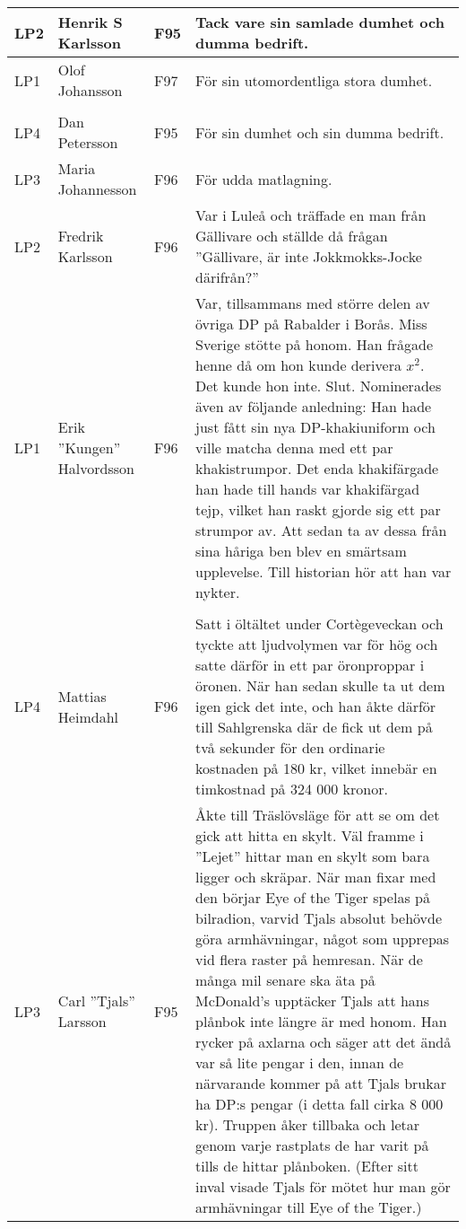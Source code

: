 \documentclass[a4paper]{article}
\begin{document}
\begin{longtable}{p{5mm}>{\raggedright\arraybackslash}p{30mm}p{10mm}p{108mm}}
LP2 & Henrik S Karlsson & F95 & Tack vare sin samlade dumhet och dumma bedrift. \\ \hline

LP1 & Olof Johansson & F97 & För sin utomordentliga stora dumhet. \\ \hline

\rowcolor{veryLightGray} \multicolumn{4}{l}{\textbf{1997/1998}} \\ \hline

LP4 & Dan Petersson & F95 & För sin dumhet och sin dumma bedrift. \\ \hline

LP3 & Maria Johannesson & F96 & För udda matlagning. \\ \hline

LP2 & Fredrik Karlsson & F96 & Var i Luleå och träffade en man från Gällivare och ställde då frågan ''Gällivare, är inte Jokkmokks-Jocke därifrån?'' \\ \hline

LP1 & Erik ''Kungen'' Halvordsson & F96 & Var, tillsammans med större delen av övriga DP på Rabalder i Borås. Miss Sverige stötte på honom. Han frågade henne då om hon kunde derivera $x^2$. Det kunde hon inte. Slut. Nominerades även av följande anledning: Han hade just fått sin nya DP-khakiuniform och ville matcha denna med ett par khakistrumpor. Det enda khakifärgade han hade till hands var khakifärgad tejp, vilket han raskt gjorde sig ett par strumpor av. Att sedan ta av dessa från sina håriga ben blev en smärtsam upplevelse. Till historian hör att han var nykter. \\ \hline
\rowcolor{veryLightGray} \multicolumn{4}{l}{\textbf{1996/1997}} \\ \hline

LP4 & Mattias Heimdahl & F96 & Satt i öltältet under Cortègeveckan och tyckte att ljudvolymen var för hög och satte därför in ett par öronproppar i öronen. När han sedan skulle ta ut dem igen gick det inte, och han åkte därför till Sahlgrenska där de fick ut dem på två sekunder för den ordinarie kostnaden på 180 kr, vilket innebär en timkostnad på 324 000 kronor. \\ \hline

LP3 & Carl ''Tjals'' Larsson & F95 & Åkte till Träslövsläge för att se om det gick att hitta en skylt. Väl framme i ''Lejet'' hittar man en skylt som bara ligger och skräpar. När man fixar med den börjar Eye of the Tiger spelas på bilradion, varvid Tjals absolut behövde göra armhävningar, något som upprepas vid flera raster på hemresan. När de många mil senare ska äta på McDonald's upptäcker Tjals att hans plånbok inte längre är med honom. Han rycker på axlarna och säger att det ändå var så lite pengar i den, innan de närvarande kommer på att Tjals brukar ha DP:s pengar (i detta fall cirka 8 000 kr). Truppen åker tillbaka och letar genom varje rastplats de har varit på tills de hittar plånboken. (Efter sitt inval visade Tjals för mötet hur man gör armhävningar till Eye of the Tiger.) \\ \hline


\end{longtable}
\end{document}
